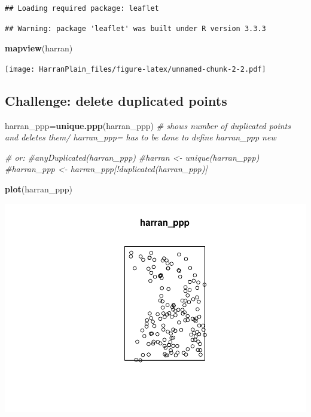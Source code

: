 \documentclass[]{article}
\newenvironment{Shaded}{\begin{snugshade}}{\end{snugshade}}
\newcommand{\KeywordTok}[1]{\textcolor[rgb]{0.13,0.29,0.53}{\textbf{{#1}}}}
\newcommand{\CommentTok}[1]{\textcolor[rgb]{0.56,0.35,0.01}{\textit{{#1}}}}
\newcommand{\NormalTok}[1]{{#1}}
\begin{document}
\begin{verbatim}
## Loading required package: leaflet
\end{verbatim}

\begin{verbatim}
## Warning: package 'leaflet' was built under R version 3.3.3
\end{verbatim}

\begin{Shaded}
\begin{Highlighting}[]
\KeywordTok{mapview}\NormalTok{(harran)}
\end{Highlighting}
\end{Shaded}

\texttt{[image: HarranPlain\_files/figure-latex/unnamed-chunk-2-2.pdf]}

\subsection{Challenge: delete duplicated
points}\label{challenge-delete-duplicated-points}

\begin{Shaded}
\begin{Highlighting}[]
\NormalTok{harran_ppp=}\KeywordTok{unique.ppp}\NormalTok{(harran_ppp) }\CommentTok{# shows number of duplicated points and deletes them/ harran_ppp= has to be done to define harran_ppp new}


\CommentTok{# or:}
\CommentTok{#anyDuplicated(harran_ppp)}
\CommentTok{#harran <- unique(harran_ppp)}
\CommentTok{#harran_ppp <- harran_ppp[!duplicated(harran_ppp)]}

\KeywordTok{plot}\NormalTok{(harran_ppp)}
\end{Highlighting}
\end{Shaded}

\includegraphics{HarranPlain_files/figure-latex/unnamed-chunk-3-1.pdf}
\end{document}
